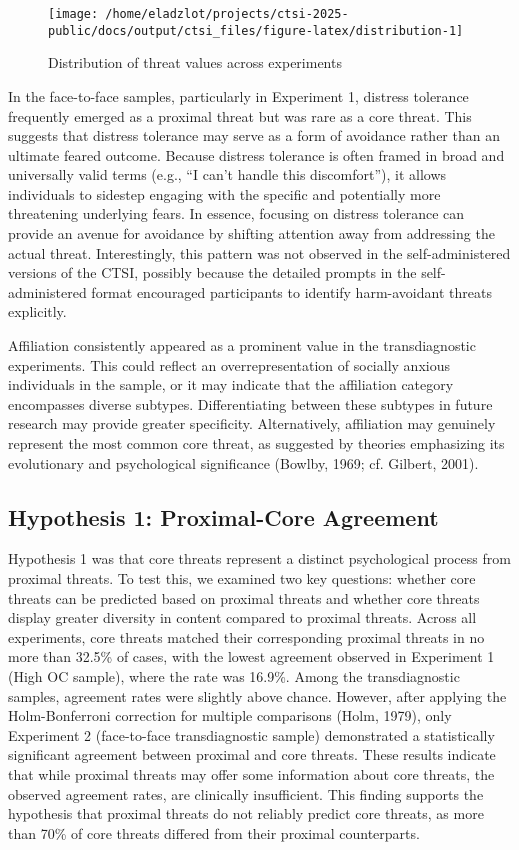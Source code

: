 \documentclass[
  man,floatsintext]{apa7}
\begin{document}
\begin{figure}
\texttt{[image: /home/eladzlot/projects/ctsi-2025-public/docs/output/ctsi\_files/figure-latex/distribution-1]} \caption{Distribution of threat values across experiments}\label{fig:distribution}
\end{figure}

In the face-to-face samples, particularly in Experiment 1, distress tolerance frequently emerged as a proximal threat but was rare as a core threat.
This suggests that distress tolerance may serve as a form of avoidance rather than an ultimate feared outcome.
Because distress tolerance is often framed in broad and universally valid terms (e.g., ``I can't handle this discomfort''), it allows individuals to sidestep engaging with the specific and potentially more threatening underlying fears.
In essence, focusing on distress tolerance can provide an avenue for avoidance by shifting attention away from addressing the actual threat.
Interestingly, this pattern was not observed in the self-administered versions of the CTSI, possibly because the detailed prompts in the self-administered format encouraged participants to identify harm-avoidant threats explicitly.

Affiliation consistently appeared as a prominent value in the transdiagnostic experiments.
This could reflect an overrepresentation of socially anxious individuals in the sample, or it may indicate that the affiliation category encompasses diverse subtypes.
Differentiating between these subtypes in future research may provide greater specificity.
Alternatively, affiliation may genuinely represent the most common core threat, as suggested by theories emphasizing its evolutionary and psychological significance (Bowlby, 1969; cf. Gilbert, 2001).

\subsection{Hypothesis 1: Proximal-Core Agreement}\label{hypothesis-1-proximal-core-agreement}

Hypothesis 1 was that core threats represent a distinct psychological process from proximal threats.
To test this, we examined two key questions: whether core threats can be predicted based on proximal threats and whether core threats display greater diversity in content compared to proximal threats.
Across all experiments, core threats matched their corresponding proximal threats in no more than 32.5\% of cases, with the lowest agreement observed in Experiment 1 (High OC sample), where the rate was 16.9\%.
Among the transdiagnostic samples, agreement rates were slightly above chance.
However, after applying the Holm-Bonferroni correction for multiple comparisons (Holm, 1979), only Experiment 2 (face-to-face transdiagnostic sample) demonstrated a statistically significant agreement between proximal and core threats.
These results indicate that while proximal threats may offer some information about core threats, the observed agreement rates, are clinically insufficient.
This finding supports the hypothesis that proximal threats do not reliably predict core threats, as more than 70\% of core threats differed from their proximal counterparts.
\end{document}

